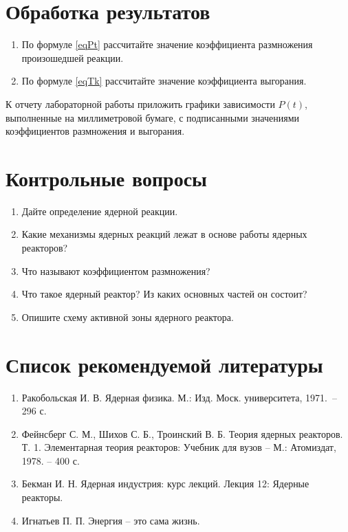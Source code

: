 \section{Обработка результатов}

\begin{enumerate}
    \item По формуле \eqref{eqPt} рассчитайте значение коэффициента размножения
    произошедшей реакции.
    \item По формуле \eqref{eqTk} рассчитайте значение коэффициента выгорания.
\end{enumerate}

К отчету лабораторной работы приложить графики зависимости \( P(t) \),
выполненные на миллиметровой бумаге, с подписанными значениями коэффициентов
размножения и выгорания.

\section{Контрольные вопросы}

\begin{enumerate}
    \singlespacing
    \itemsep -.5pt
    \item Дайте определение ядерной реакции.
    \item Какие механизмы ядерных реакций лежат в основе работы ядерных
    реакторов?
    \item Что называют коэффициентом размножения?
    \item Что такое ядерный реактор? Из каких основных частей он состоит?
    \item Опишите схему активной зоны ядерного реактора.
\end{enumerate}

\section{Список рекомендуемой литературы}
\begin{enumerate}
    \item Ракобольская И. В. Ядерная физика. М.: Изд. Моск. университета,
    1971.~-- 296 с.
    \item Фейнсберг С. М., Шихов С. Б., Троинский В. Б. Теория ядерных
    реакторов. Т. 1. Элементарная теория реакторов: Учебник для вузов -- М.:
    Атомиздат, 1978. -- 400 с.
    \item Бекман И. Н. Ядерная индустрия: курс лекций. Лекция 12: Ядерные
    реакторы.
    \item Игнатьев П. П. Энергия -- это сама жизнь.
\end{enumerate}